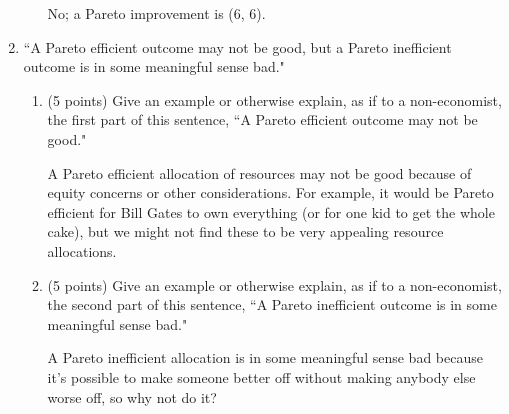 \documentclass[twoside]{article}
\newcommand{\mybigskip}{\vspace{1in}}
\begin{document}
\begin{enumerate}
\begin{enumerate}
\begin{KEY}
No; a Pareto improvement is (6, 6).
\end{KEY}

    \end{enumerate}









\item \begin{EXAM} ``A Pareto efficient outcome may not be good, but a Pareto inefficient outcome is in some meaningful sense bad."\end{EXAM}

    \begin{enumerate}
    \item \begin{EXAM} (5 points) Give an example or otherwise explain, as if to a non-economist, the first part of this sentence, ``A Pareto efficient outcome may not be good." \vspace{1.7in}\end{EXAM}

\begin{KEY}
A Pareto efficient allocation of resources may not be good because of equity concerns or other considerations. For example, it would be Pareto efficient for Bill Gates to own everything (or for one kid to get the whole cake), but we might not find these to be very appealing resource allocations.
\end{KEY}


    \item \begin{EXAM} (5 points) Give an example or otherwise explain, as if to a non-economist, the second part of this sentence, ``A Pareto inefficient outcome is in some meaningful sense bad." \vspace{1.7in}\end{EXAM}

\begin{KEY}
A Pareto inefficient allocation is in some meaningful sense bad because it's possible to make someone better off without making anybody else worse off, so why not do it?
\end{KEY}

    \end{enumerate}












\end{enumerate}
\end{document}
